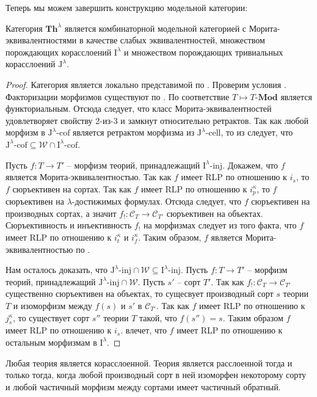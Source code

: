 \documentclass[reqno]{amsart}
\theoremstyle{definition}
\theoremstyle{remark}
\newcommand{\bcat}[1]{\mathbf{#1}}
\newcommand{\cat}[1]{\mathcal{#1}}
\newcommand{\we}{\mathcal{W}}
\newcommand{\Mod}[1]{#1\text{-}\bcat{Mod}}
\newcommand{\Th}{\bcat{Th}}
\newcommand{\I}{\mathrm{I}}
\newcommand{\J}{\mathrm{J}}
\newcommand{\class}[2]{#1\text{-}\mathrm{#2}}
\newcommand{\Iinj}[1][\I]{\class{#1}{inj}}
\newcommand{\Icell}[1][\I]{\class{#1}{cell}}
\newcommand{\Icof}[1][\I]{\class{#1}{cof}}
\begin{document}
Теперь мы можем завершить конструкцию модельной категории:

\begin{thm}
Категория $\Th^\lambda$ является комбинаторной модельной категорией с Морита-эквивалентностями в качестве слабых эквивалентностей, множеством порождающих корасслоений $\I^\lambda$ и множеством порождающих тривиальных корасслоений $\J^\lambda$.
\end{thm}
\begin{proof}
Категория является локально представимой по .
Проверим условия .
Факторизации морфизмов существуют по .
По  соответствие $T \mapsto \Mod{T}$ является функториальным.
Отсюда следует, что класс Морита-эквивалентностей удовлетворяет свойству 2-из-3 и замкнут относительно ретрактов.
Так как любой морфизм в $\Icof[\J^\lambda]$ является ретрактом морфизма из $\Icell[\J^\lambda]$, то из  следует, что $\Icof[\J^\lambda] \subseteq \we \cap \Icof[\I^\lambda]$.

Пусть $f : T \to T'$ -- морфизм теорий, принадлежащий $\Iinj[\I^\lambda]$.
Докажем, что $f$ является Морита-эквивалентностью.
Так как $f$ имеет RLP по отношению к $i_s$, то $f$ сюръективен на сортах.
Так как $f$ имеет RLP по отношению к $i_p^\kappa$, то $f$ сюръективен на $\lambda$-достижимых формулах.
Отсюда следует, что $f$ сюръективен на производных сортах, а значит $f_! : \cat{C}_T \to \cat{C}_{T'}$ сюръективен на объектах.
Сюръективность и инъективность $f_!$ на морфизмах следует из того факта, что $f$ имеет RLP по отношению к $i_t^\kappa$ и $i_f^\kappa$.
Таким образом, $f$ является Морита-эквивалентностью по .

Нам осталось доказать, что $\Iinj[\J^\lambda] \cap \we \subseteq \Iinj[\I^\lambda]$.
Пусть $f : T \to T'$ -- морфизм теорий, принадлежащий $\Iinj[\J^\lambda] \cap \we$.
Пусть $s'$ -- сорт $T'$.
Так как $f_! : \cat{C}_T \to \cat{C}_{T'}$ существенно сюръективен на объектах, то сущесвует производный сорт $s$ теории $T$ и изоморфизм между $f(s)$ и $s'$ в $\cat{C}_{T'}$.
Так как $f$ имеет RLP по отношению к $j_s^\kappa$, то существует сорт $s''$ теории $T$ такой, что $f(s'') = s$.
Таким образом $f$ имеет RLP по отношению к $i_s$.
 влечет, что $f$ имеет RLP по отношению к остальным морфизмам в $\I^\lambda$.
\end{proof}

\begin{remark}
Любая теория является корасслоенной.
Теория является расслоенной тогда и только тогда, когда любой производный сорт в ней изоморфен некоторому сорту и любой частичный морфизм между сортами имеет частичный обратный.
\end{remark}
\end{document}
